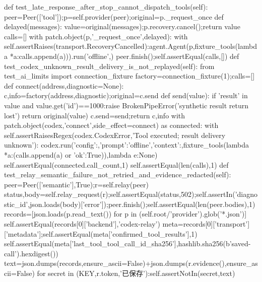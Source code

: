 {    def test_late_response_after_stop_cannot_dispatch_tools(self):
        peer=Peer(['tool']);p=self.provider(peer);original=p._request_once
        def delayed(messages):
            value=original(messages);p.recovery.cancel();return value
        calls=[]
        with patch.object(p,'_request_once',delayed):
            with self.assertRaises(transport.RecoveryCancelled):agent.Agent(p,fixture_tools(lambda *a:calls.append(a))).run('offline',{})
        peer.finish();self.assertEqual(calls,[])
    def test_codex_unknown_result_delivery_is_not_replayed(self):
        from test_ai_limits import connection_fixture
        factory=connection_fixture(1);calls=[]
        def connect(address,diagnostic=None):
            c,info=factory(address,diagnostic);original=c.send
            def send(value):
                if 'result' in value and value.get('id')==1000:raise BrokenPipeError('synthetic result return lost')
                return original(value)
            c.send=send;return c,info
        with patch.object(codex,'connect',side_effect=connect) as connected:
            with self.assertRaisesRegex(codex.CodexError,'Tool executed; result delivery unknown'):
                codex.run({'config':{},'prompt':'offline','context':{}},fixture_tools(lambda *a:(calls.append(a) or {'ok':True})),lambda e:None)
            self.assertEqual(connected.call_count,1)
        self.assertEqual(len(calls),1)
    def test_relay_semantic_failure_not_retried_and_evidence_redacted(self):
        peer=Peer(['semantic'],True);r=self.relay(peer)
        status,body=self.relay_request(r);self.assertEqual(status,502);self.assertIn('diagnostic_id',json.loads(body)['error']);peer.finish();self.assertEqual(len(peer.bodies),1)
        records=[json.loads(p.read_text()) for p in (self.root/'provider').glob('*.json')]
        self.assertEqual(records[0]['backend'],'codex-relay')
        meta=records[0]['transport']['metadata'];self.assertEqual(meta['confirmed_tool_results'],1)
        self.assertEqual(meta['last_tool_tool_call_id_sha256'],hashlib.sha256(b'saved-call').hexdigest())
        text=json.dumps(records,ensure_ascii=False)+json.dumps(r.evidence(),ensure_ascii=False)
        for secret in (KEY,r.token,'已保存'):self.assertNotIn(secret,text)

}

